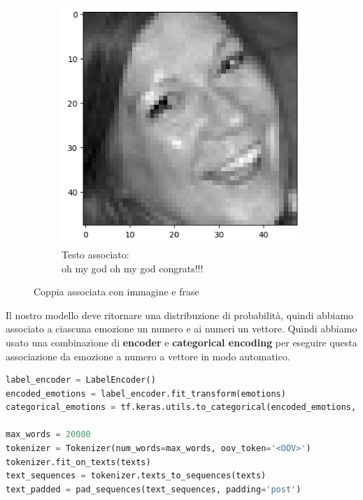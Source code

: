 \documentclass{article}
\begin{document}
\begin{figure}[H]
\begin{subfigure}{0.4\linewidth}
        \includegraphics[width=\linewidth]{image2.png}
        \caption{Testo associato:\\ oh my god oh my god congrats!!!}
        \label{fig:image2}
    \end{subfigure}
    \caption{Coppia associata con immagine e frase}
    \label{fig:main}
\end{figure}

\bigskip

Il nostro modello deve ritornare una distribuzione di probabilità, quindi abbiamo associato a ciascuna emozione un numero e ai numeri un vettore. Quindi abbiamo usato una combinazione di \textbf{encoder} e \textbf{categorical encoding} per eseguire questa associazione da emozione a numero a vettore in modo automatico.

\bigskip

\begin{lstlisting}[language=Python, caption=Pre-processing delle frasi]
label_encoder = LabelEncoder()
encoded_emotions = label_encoder.fit_transform(emotions)
categorical_emotions = tf.keras.utils.to_categorical(encoded_emotions, num_classes=len(label_encoder.classes_))

max_words = 20000
tokenizer = Tokenizer(num_words=max_words, oov_token='<OOV>')
tokenizer.fit_on_texts(texts)
text_sequences = tokenizer.texts_to_sequences(texts)
text_padded = pad_sequences(text_sequences, padding='post')
\end{lstlisting}
\end{document}
